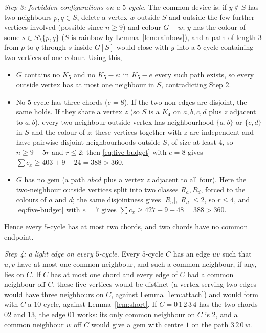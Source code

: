 \documentclass[11pt]{article}
\theoremstyle{remark}
\begin{document}
\emph{Step 3: forbidden configurations on a $5$-cycle.} The common device is:
if $y\notin S$ has two neighbours $p,q\in S$, delete a vertex $w$ outside $S$
and outside the few further vertices involved (possible since $n\ge9$) and
colour $G-w$; $y$ has the colour of some $s\in S\setminus\{p,q\}$ ($S$ is
rainbow by Lemma~\ref{lem:rainbow}), and a path of length $3$ from $p$ to $q$
through $s$ inside $G[S]$ would close with $y$ into a $5$-cycle containing two
vertices of one colour. Using this,
\begin{itemize}
\item $G$ contains no $K_5$ and no $K_5-e$: in $K_5-e$ every such path exists,
so every outside vertex has at most one neighbour in $S$, contradicting Step 2.
\item No $5$-cycle has three chords ($e=8$). If the two non-edges are disjoint,
the same holds. If they share a vertex $z$ (so $S$ is a $K_4$ on $a,b,c,d$ plus
$z$ adjacent to $a,b$), every two-neighbour outside vertex has neighbourhood
$\{a,b\}$ or $\{c,d\}$ in $S$ and the colour of $z$; these vertices together
with $z$ are independent and have pairwise disjoint neighbourhoods outside $S$,
of size at least $4$, so $n\ge9+5r$ and $r\le2$; then \eqref{eq:five-budget}
with $e=8$ gives $\sum c_x\ge 403+9-24=388>360$.
\item $G$ has no gem (a path $abcd$ plus a vertex $z$ adjacent to all four).
Here the two-neighbour outside vertices split into two classes $R_a,R_d$, forced
to the colours of $a$ and $d$; the same disjointness gives
$|R_a|,|R_d|\le2$, so $r\le4$, and \eqref{eq:five-budget} with $e=7$ gives
$\sum c_x\ge 427+9-48=388>360$.
\end{itemize}
Hence every $5$-cycle has at most two chords, and two chords have no common
endpoint.

\emph{Step 4: a light edge on every $5$-cycle.} Every $5$-cycle $C$ has an edge
$uv$ such that $u,v$ have at most one common neighbour, and such a common
neighbour, if any, lies on $C$. If
$C$ has at most one chord and every edge of $C$ had a common neighbour off $C$,
these five vertices would be distinct (a vertex serving two edges would have
three neighbours on $C$, against Lemma~\ref{lem:attach}) and would form with $C$
a $10$-cycle, against Lemma~\ref{lem:short}. If $C=0\,1\,2\,3\,4$ has the two
chords $02$ and $13$, the edge $01$ works: its only common neighbour on $C$ is
$2$, and a common neighbour $w$ off $C$ would give a gem with centre $1$ on the
path $3\,2\,0\,w$.
\end{document}
